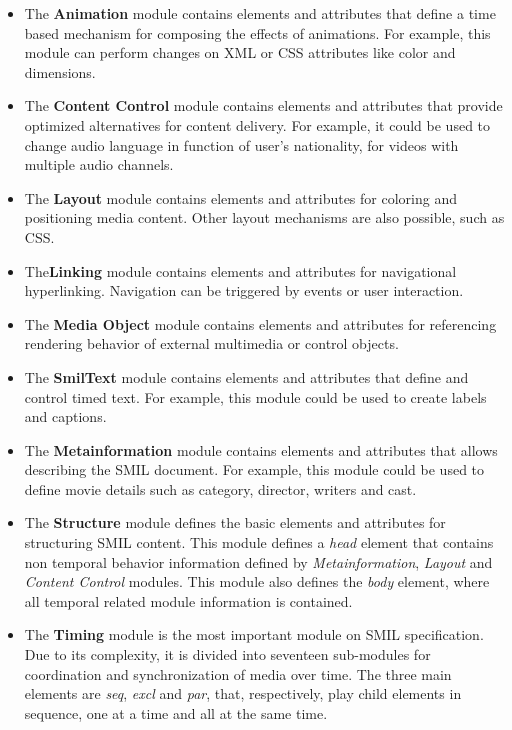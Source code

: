 \begin{itemize}

  \item The \textbf{Animation} module contains elements and attributes that define a time based mechanism for composing the effects of animations. For example, this module can perform changes on \ac{XML} or \ac{CSS} attributes like color and dimensions.  

  \item The \textbf{Content Control} module contains elements and attributes that provide optimized alternatives for content delivery. For example, it could be used to change audio language in function of user's nationality, for videos with multiple audio channels.

  \item The \textbf{Layout} module contains elements and attributes for coloring and positioning media content. Other layout mechanisms are also possible, such as \ac{CSS}.

  \item The\textbf{Linking} module contains elements and attributes for navigational hyperlinking. Navigation can be triggered by events or user interaction.

  \item The \textbf{Media Object} module contains elements and attributes for referencing rendering behavior of external multimedia or control objects.

  \item The \textbf{SmilText} module contains elements and attributes that define and control timed text. For example, this module could be used to create labels and captions.

  \item The \textbf{Metainformation} module contains elements and attributes that allows describing the \ac{SMIL} document. For example, this module could be used to define movie details such as category, director, writers and cast.

  \item The \textbf{Structure} module defines the basic elements and attributes for structuring \ac{SMIL} content. This module defines a \emph{head} element that contains non temporal behavior information defined by  \emph{Metainformation}, \emph{Layout} and \emph{Content Control} modules. This module also defines the \emph{body} element, where all temporal related module information is contained.

  \item The \textbf{Timing} module is the most important module on \ac{SMIL} specification. Due to its complexity, it is divided into seventeen sub-modules for coordination and synchronization of media over time. The three main elements are \emph{seq}, \emph{excl} and \emph{par}, that, respectively, play child elements in sequence, one at a time and all at the same time. 


\end{itemize}
